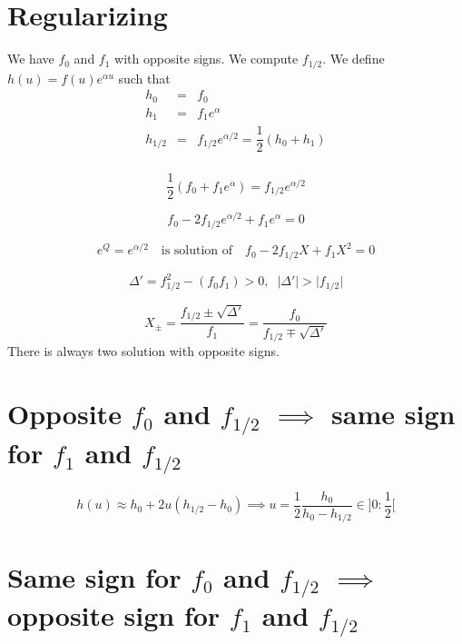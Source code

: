 \documentclass[aps,12pt]{revtex4}
\begin{document}
\section{Regularizing}
We have $f_0$ and $f_1$ with opposite signs.
We compute $f_{1/2}$.
We define $h(u) = f(u) e^{\alpha u}$ such that
\begin{equation}
\begin{array}{lcl}
h_0  & = & f_0  \\
h_1  & = & f_1 e^{\alpha} \\
h_{1/2} & = & f_{1/2} e^{\alpha/2} = \dfrac{1}{2}( h_0+h_1 )\\
\end{array}
\end{equation}
 
\begin{equation}
	\dfrac{1}{2}( f_0+f_1 e^\alpha ) = f_{1/2} e^{\alpha/2} 
\end{equation} 

\begin{equation}
	f_0 - 2 f_{1/2} e^{\alpha/2}  + f_1 e^\alpha = 0
\end{equation} 

$$
	e^Q = e^{\alpha/2} \text{~~~is solution of~~~} f_0 - 2 f_{1/2} X  + f_1 X^2 = 0
$$

\begin{equation}
	\Delta' = f_{1/2}^2 - (f_0f_1) > 0, \;\; \vert \Delta' \vert > \vert f_{1/2} \vert
\end{equation}

\begin{equation}
	X_\pm = \dfrac{ f_{1/2} \pm \sqrt{\Delta'} }{f_1} = \dfrac{f_0}{f_{1/2} \mp \sqrt{\Delta'}}
\end{equation}
There is always two solution with opposite signs.
 
\section{Opposite $f_0$ and $f_{1/2}$ $\implies$ same sign for $f_1$ and $f_{1/2}$}
 
 $$
 	h(u) \approx h_0 + 2 u (h_{1/2}-h_0) \implies u = \dfrac{1}{2} \dfrac{h_0}{h_0-h_{1/2}} \in ]0:\frac{1}{2}[
 $$
 
 \section{Same sign for $f_0$ and $f_{1/2}$ $\implies$ opposite sign for $f_1$ and $f_{1/2}$}

 
  
  
\end{document}
